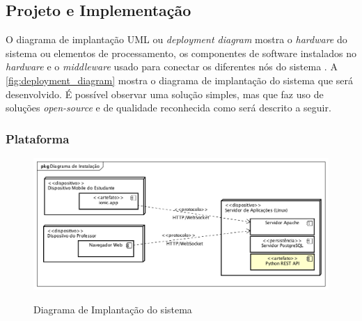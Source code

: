 \subsection{Projeto e Implementação}
O diagrama de implantação UML ou \textit{deployment diagram} mostra o \textit{hardware}
do sistema ou elementos de processamento, os componentes de software instalados
no \textit{hardware} e o \textit{middleware} usado para conectar os diferentes
nós do sistema \cite{Pressman2009}. A \autoref{fig:deployment_diagram} mostra
o diagrama de implantação do sistema que será desenvolvido. É possível observar
uma solução simples, mas que faz uso de soluções \textit{open-source} e de
qualidade reconhecida como será descrito a seguir.

\subsubsection{Plataforma}

\begin{figure}[!b]
  \centering
  \caption{Diagrama de Implantação do sistema}
  \includegraphics[width=1\textwidth]{imagens/deployment_diagram}
  \label{fig:deployment_diagram}
\end{figure}

